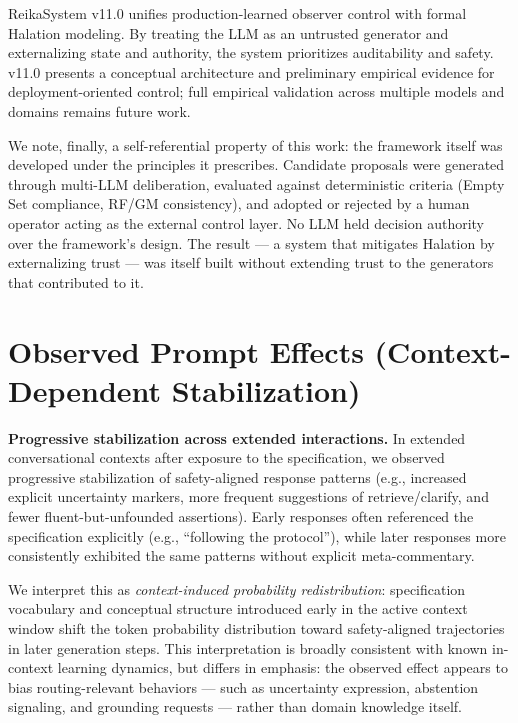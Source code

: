 \documentclass[11pt,a4paper]{article}
\begin{document}
ReikaSystem v11.0 unifies production-learned observer control with formal Halation modeling.
By treating the LLM as an untrusted generator and externalizing state and authority, the system
prioritizes auditability and safety. v11.0 presents a conceptual architecture and
preliminary empirical evidence for deployment-oriented control;
full empirical validation across multiple models and domains remains future work.

We note, finally, a self-referential property of this work:
the framework itself was developed under the principles it prescribes.
Candidate proposals were generated through multi-LLM deliberation,
evaluated against deterministic criteria (Empty Set compliance, RF/GM consistency),
and adopted or rejected by a human operator acting as the external control layer.
No LLM held decision authority over the framework's design.
The result --- a system that mitigates Halation by externalizing trust ---
was itself built without extending trust to the generators that contributed to it.

\appendix
\section{Observed Prompt Effects (Context-Dependent Stabilization)}

\textbf{Progressive stabilization across extended interactions.}
In extended conversational contexts after exposure to the specification, we observed
progressive stabilization of safety-aligned response patterns (e.g., increased explicit
uncertainty markers, more frequent suggestions of retrieve/clarify, and fewer
fluent-but-unfounded assertions). Early responses often referenced the specification
explicitly (e.g., ``following the protocol''), while later responses more consistently
exhibited the same patterns without explicit meta-commentary.

We interpret this as \textit{context-induced probability redistribution}: specification
vocabulary and conceptual structure introduced early in the active context window shift
the token probability distribution toward safety-aligned trajectories in later generation
steps. This interpretation is broadly consistent with known in-context learning dynamics,
but differs in emphasis: the observed effect appears to bias routing-relevant
behaviors --- such as uncertainty expression, abstention signaling, and grounding
requests --- rather than domain knowledge itself.
\end{document}
